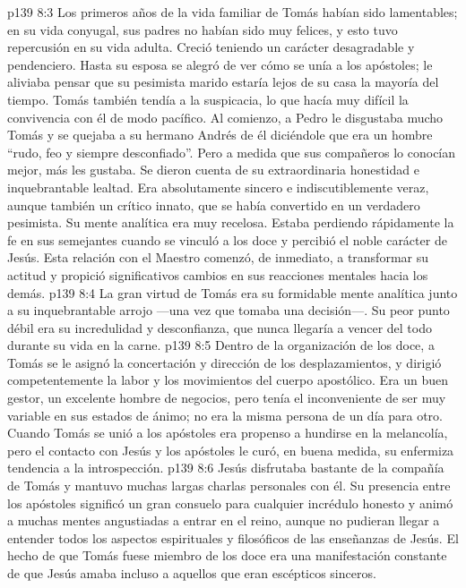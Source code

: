 \vs p139 8:3 Los primeros años de la vida familiar de Tomás habían sido lamentables; en su vida conyugal, sus padres no habían sido muy felices, y esto tuvo repercusión en su vida adulta. Creció teniendo un carácter desagradable y pendenciero. Hasta su esposa se alegró de ver cómo se unía a los apóstoles; le aliviaba pensar que su pesimista marido estaría lejos de su casa la mayoría del tiempo. Tomás también tendía a la suspicacia, lo que hacía muy difícil la convivencia con él de modo pacífico. Al comienzo, a Pedro le disgustaba mucho Tomás y se quejaba a su hermano Andrés de él diciéndole que era un hombre “rudo, feo y siempre desconfiado”. Pero a medida que sus compañeros lo conocían mejor, más les gustaba. Se dieron cuenta de su extraordinaria honestidad e inquebrantable lealtad. Era absolutamente sincero e indiscutiblemente veraz, aunque también un crítico innato, que se había convertido en un verdadero pesimista. Su mente analítica era muy recelosa. Estaba perdiendo rápidamente la fe en sus semejantes cuando se vinculó a los doce y percibió el noble carácter de Jesús. Esta relación con el Maestro comenzó, de inmediato, a transformar su actitud y propició significativos cambios en sus reacciones mentales hacia los demás.
\vs p139 8:4 La gran virtud de Tomás era su formidable mente analítica junto a su inquebrantable arrojo ---una vez que tomaba una decisión---. Su peor punto débil era su incredulidad y desconfianza, que nunca llegaría a vencer del todo durante su vida en la carne.
\vs p139 8:5 Dentro de la organización de los doce, a Tomás se le asignó la concertación y dirección de los desplazamientos, y dirigió competentemente la labor y los movimientos del cuerpo apostólico. Era un buen gestor, un excelente hombre de negocios, pero tenía el inconveniente de ser muy variable en sus estados de ánimo; no era la misma persona de un día para otro. Cuando Tomás se unió a los apóstoles era propenso a hundirse en la melancolía, pero el contacto con Jesús y los apóstoles le curó, en buena medida, su enfermiza tendencia a la introspección.
\vs p139 8:6 Jesús disfrutaba bastante de la compañía de Tomás y mantuvo muchas largas charlas personales con él. Su presencia entre los apóstoles significó un gran consuelo para cualquier incrédulo honesto y animó a muchas mentes angustiadas a entrar en el reino, aunque no pudieran llegar a entender todos los aspectos espirituales y filosóficos de las enseñanzas de Jesús. El hecho de que Tomás fuese miembro de los doce era una manifestación constante de que Jesús amaba incluso a aquellos que eran escépticos sinceros.
